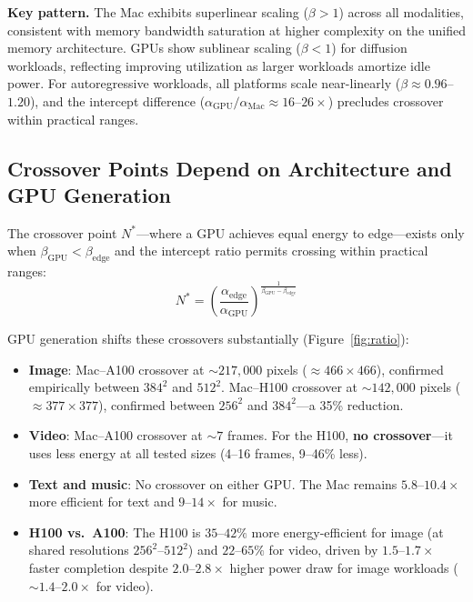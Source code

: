 \documentclass[acmlarge,manuscript,screen,review]{acmart}
\begin{document}
\textbf{Key pattern.}\quad
The Mac exhibits superlinear scaling ($\beta > 1$) across all modalities, consistent with memory bandwidth saturation at higher complexity on the unified memory architecture. GPUs show sublinear scaling ($\beta < 1$) for diffusion workloads, reflecting improving utilization as larger workloads amortize idle power. For autoregressive workloads, all platforms scale near-linearly ($\beta \approx 0.96$--$1.20$), and the intercept difference ($\alpha_\text{GPU} / \alpha_\text{Mac} \approx 16$--$26\times$) precludes crossover within practical ranges.

\subsection{Crossover Points Depend on Architecture and GPU Generation}

The crossover point $N^*$---where a GPU achieves equal energy to edge---exists only when $\beta_\text{GPU} < \beta_\text{edge}$ and the intercept ratio permits crossing within practical ranges:
\begin{equation}
N^* = \left(\frac{\alpha_\text{edge}}{\alpha_\text{GPU}}\right)^{\frac{1}{\beta_\text{GPU} - \beta_\text{edge}}}
\end{equation}

GPU generation shifts these crossovers substantially (Figure~\ref{fig:ratio}):

\begin{itemize}[leftmargin=*]
\item \textbf{Image}: Mac--A100 crossover at ${\sim}217{,}000$ pixels ($\approx 466 \times 466$), confirmed empirically between $384^2$ and $512^2$. Mac--H100 crossover at ${\sim}142{,}000$ pixels ($\approx 377 \times 377$), confirmed between $256^2$ and $384^2$---a 35\% reduction.
\item \textbf{Video}: Mac--A100 crossover at ${\sim}7$ frames. For the H100, \textbf{no crossover}---it uses less energy at all tested sizes (4--16 frames, 9--46\% less).
\item \textbf{Text and music}: No crossover on either GPU. The Mac remains $5.8$--$10.4\times$ more efficient for text and $9$--$14\times$ for music.
\item \textbf{H100 vs.\ A100}: The H100 is $35$--$42\%$ more energy-efficient for image (at shared resolutions $256^2$--$512^2$) and $22$--$65\%$ for video, driven by $1.5$--$1.7\times$ faster completion despite $2.0$--$2.8\times$ higher power draw for image workloads (${\sim}1.4$--$2.0\times$ for video).
\end{itemize}
\end{document}
